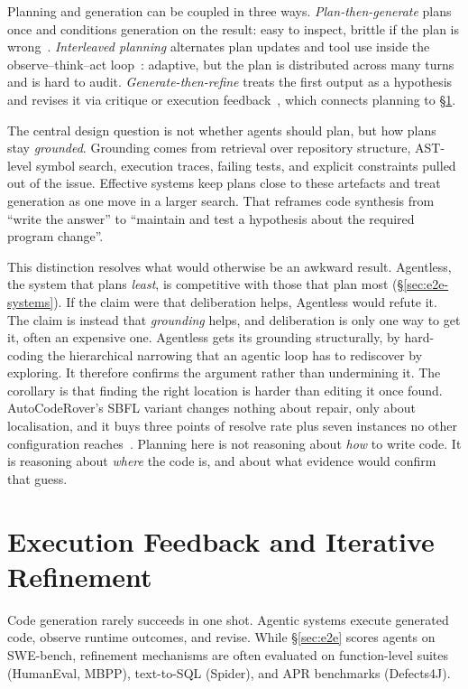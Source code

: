 \documentclass[
  english,        %
  font=times,     %
  twocolumn,      %
]{tumarticle}
\begin{document}
Planning and generation can be coupled in three ways.
\emph{Plan-then-generate} plans once and conditions generation on the result: easy
to inspect, brittle if the plan is wrong~\cite{xia2024agentless}.
\emph{Interleaved planning} alternates plan updates and tool use inside the
observe--think--act loop~\cite{yao2023react}: adaptive, but the plan is
distributed across many turns and is hard to audit. \emph{Generate-then-refine}
treats the first output as a hypothesis and revises it via critique or execution
feedback~\cite{madaan2023selfrefine}, which connects planning to
\S\ref{sec:refinement}.

The central design question is not whether agents should plan, but how plans stay
\emph{grounded}. Grounding comes from retrieval over repository structure,
AST-level symbol search, execution traces, failing tests, and explicit constraints
pulled out of the issue. Effective systems keep plans close to these artefacts and
treat generation as one move in a larger search. That reframes code synthesis from
``write the answer'' to ``maintain and test a hypothesis about the required
program change''.

This distinction resolves what would otherwise be an awkward result. Agentless,
the system that plans \emph{least}, is competitive with those that plan most
(\S\ref{sec:e2e-systems}). If the claim were that deliberation helps, Agentless
would refute it. The claim is instead that \emph{grounding} helps, and
deliberation is only one way to get it, often an expensive one. Agentless gets its
grounding structurally, by hard-coding the hierarchical narrowing that an agentic
loop has to rediscover by exploring. It therefore confirms the argument rather
than undermining it. The corollary is that finding the right location is harder
than editing it once found. AutoCodeRover's SBFL variant changes nothing about
repair, only about localisation, and it buys three points of resolve rate plus
seven instances no other configuration reaches~\cite{zhang2024autocoderover}.
Planning here is not reasoning about \emph{how} to write code. It is reasoning
about \emph{where} the code is, and about what evidence would confirm that guess.

\section{Execution Feedback and Iterative Refinement}
\label{sec:refinement}

Code generation rarely succeeds in one shot. Agentic systems execute generated
code, observe runtime outcomes, and revise. While \S\ref{sec:e2e} scores agents on
SWE-bench, refinement mechanisms are often evaluated on function-level suites
(HumanEval, MBPP), text-to-SQL (Spider), and APR benchmarks (Defects4J).
\end{document}
